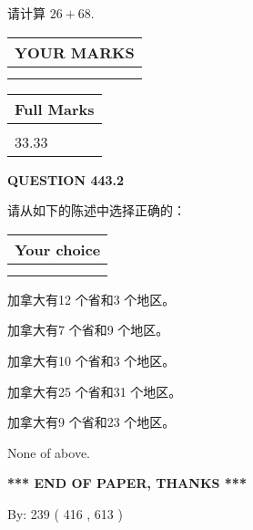 \documentclass{ctexart}
\begin{document}
  
 
请计算 $ %
26 +  %
68 $.
 

 

 
  
\vspace{0.2in}
  
\noindent\begin{tabular}{|l|}
\hline
 YOUR MARKS  \\
\hline
 \\ 
 \\ 
\hline
\end{tabular}
\hspace{0.05in} \begin{tabular}{|l|}
\hline
 Full Marks  \\
\hline
 \\ 
33.33 \\
\hline
\end{tabular}
{\textbf{\Large{QUESTION
443.2 
}}}
  
  
请从如下的陈述中选择正确的：
  
  
\noindent\hspace{3.0in} \begin{tabular}{|l|}
\hline
Your choice \\
\hline
 \\ 
 \\ 
\hline
\end{tabular}
  
  
 
 
加拿大有12 个省和3 个地区。
 
 
加拿大有7 个省和9 个地区。
 
 
加拿大有10 个省和3 个地区。
 
 
加拿大有25 个省和31 个地区。
 
 
加拿大有9 个省和23 个地区。
 
 
 None of above.
 
 
   
   
 \vspace{0.2in}
 
   
   
   
   
\vspace{1.0in} 
{\textbf{\large{ *** END OF PAPER, THANKS *** }}} 
   
   
\hspace{1.0in} By: 
 239 ( 416 ,  613 )
   
\end{document}
